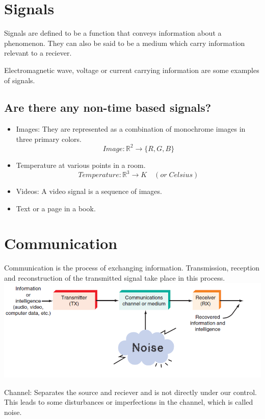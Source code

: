 \documentclass{article}
\begin{document}
\section{Signals}
Signals are defined to be a function that conveys information about a phenomenon.
They can also be said to be a medium which carry information relevant to a reciever.

Electromagnetic wave, voltage or current carrying information are some examples of signals.

\subsection{Are there any non-time based signals?}
\begin{itemize}
    \item Images: They are represented as a combination of  monochrome images in three primary colors.
    $$ Image: \mathbb{R}^2 \rightarrow \{ R, G, B\}$$
    \item Temperature at various points in a room.
    $$ Temperature:\mathbb{R}^3 \rightarrow K \quad(or\; Celsius)$$
    \item Videos:  A video signal is a sequence of images.
    \item Text or a page in a book.
\end{itemize}

\section{Communication}
Communication is the process of exchanging information. Transmission, reception and reconstruction of the transmitted signal take place in this process.
\includegraphics[width=\textwidth]{ptp.png}

Channel: Separates the source and reciever and is not directly under our control.
This leads to some disturbances or imperfections in the channel, which is called noise.
\end{document}
